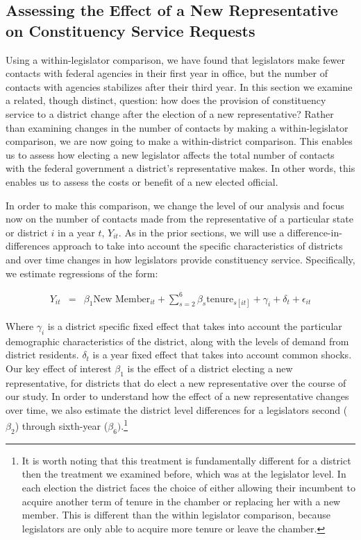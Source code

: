 \documentclass[12pt]{article}
\begin{document}
\subsection{Assessing the Effect of a New Representative on Constituency Service Requests}\label{s:tenure_dist}

Using a within-legislator comparison, we have found that legislators make fewer contacts with federal agencies in their first year in office, but the number of contacts with agencies stabilizes after their third year. In this section we examine a related, though distinct, question: how does the provision of constituency service to a district change after the election of a new representative? Rather than examining changes in the number of contacts by making a within-legislator comparison, we are now going to make a within-district comparison. This enables us to assess how electing a new legislator affects the total number of contacts with the federal government a district's representative makes. In other words, this enables us to assess the costs or benefit of a new elected official.   


In order to make this comparison, we change the level of our analysis and focus now on the number of contacts made from the representative of a particular state or district $i$ in a year $t$, $Y_{it}$. As in the prior sections, we will use a difference-in-differences approach to take into account the specific characteristics of districts and over time changes in how legislators provide constituency service. Specifically, we estimate regressions of the form: 


\begin{eqnarray}
Y_{it} & = & \beta_{1}\text{New Member}_{it} + \sum_{s = 2}^{6} \beta_{s} \text{tenure}_{s[it]} + \gamma_{i} + \delta_{t} + \epsilon_{it} \label{e:district1} 
\end{eqnarray}

Where $\gamma_{i}$ is a district specific fixed effect that takes into account the particular demographic characteristics of the district, along with the levels of demand from district residents. $\delta_{t}$ is a year fixed effect that takes into account common shocks. Our key effect of interest $\beta_{1}$ is the effect of a district electing a new representative, for districts that do elect a new representative over the course of our study. In order to understand how the effect of a new representative changes over time, we also estimate the district level differences for a legislators second ($\beta_{2}$) through sixth-year ($\beta_{6})$.\footnote{It is worth noting that this treatment is fundamentally different for a district then the treatment we examined before, which was at the legislator level. In each election the district faces the choice of either allowing their incumbent to acquire another term of tenure in the chamber or replacing her with a new member. This is different than the within legislator comparison, because legislators are only able to acquire more tenure or leave the chamber.}
\end{document}
